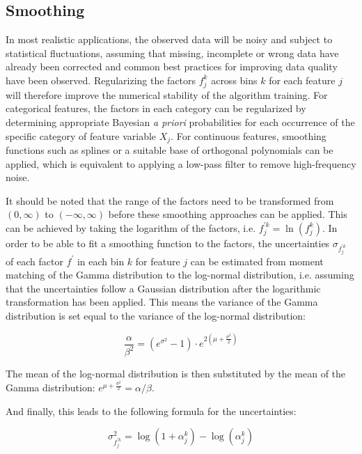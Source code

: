 \documentclass[BCOR=1mm, DIV=calc,10pt,
twoside=true,
twocolumn,
headings=normal]{scrartcl}
\begin{document}
\subsection{Smoothing}
\label{smoothing}

In most realistic applications, the observed data will be noisy and subject to statistical
fluctuations, assuming that missing, incomplete or wrong data have already been corrected
and common best practices for improving data quality have been observed. Regularizing the 
factors $f^k_j$ across bins $k$ for each feature $j$ will therefore improve the numerical
stability of the algorithm training. For categorical features, the factors in each
category can be regularized by determining appropriate Bayesian {\em a priori}
probabilities for each occurrence of the specific category of feature variable $X_j$. For
continuous features, smoothing functions such as splines or a suitable base of orthogonal
polynomials can be applied, which is equivalent to applying a low-pass filter to remove
high-frequency noise.

It should be noted that the range of the factors need to be transformed from $(0, \infty)$
to $(-\infty, \infty)$ before these smoothing approaches can be applied. This can be
achieved by taking the logarithm of the factors, i.e. $f^{\prime k}_j = \ln(f^k_j)$. In
order to be able to fit a smoothing function to the factors, the uncertainties
$\sigma_{f^{\prime k}_j}$ of each factor $f^\prime$ in each bin $k$ for feature $j$ can be
estimated from moment matching of the Gamma distribution to the log-normal distribution,
i.e. assuming that the uncertainties follow a Gaussian distribution after the logarithmic
transformation has been applied. This means the variance of the Gamma distribution is set
equal to the variance of the log-normal distribution:

\begin{equation}
\frac{\alpha}{\beta^2} = (e^{\sigma^2} - 1) \cdot e^{2(\mu + \frac{\sigma^2}{2})}
\end{equation}

\noindent
The mean of the log-normal distribution is then substituted by the mean of the Gamma
distribution: $e^{\mu + \frac{\sigma^2}{2}} = {\alpha}/{\beta}$.

\noindent
And finally, this leads to the following formula for the uncertainties:

\begin{equation}
\sigma^2_{f^{\prime k}_j} = \log (1 + \alpha^k_j) - \log (\alpha^k_j)
\end{equation}
\end{document}

